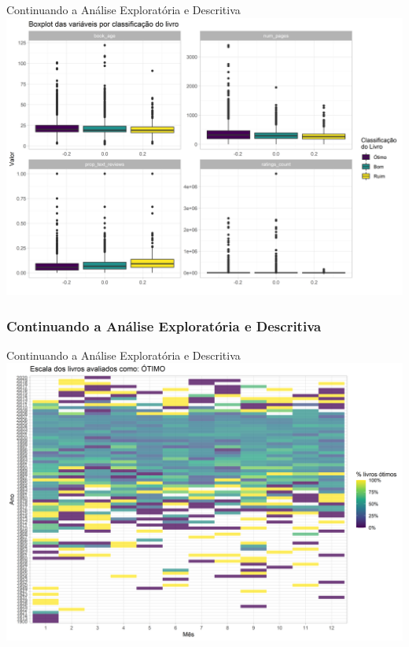 \documentclass[
  9 pt,
  ignorenonframetext,
]{beamer}
\begin{document}
\begin{frame}{Continuando a Análise Exploratória e Descritiva}
\includegraphics{apresentacao_files/figure-beamer/unnamed-chunk-7-1.png}
\end{frame}

\hypertarget{continuando-a-anuxe1lise-exploratuxf3ria-e-descritiva-1}{%
\subsubsection{Continuando a Análise Exploratória e
Descritiva}\label{continuando-a-anuxe1lise-exploratuxf3ria-e-descritiva-1}}

\begin{frame}{Continuando a Análise Exploratória e Descritiva}
\includegraphics{apresentacao_files/figure-beamer/unnamed-chunk-8-1.png}
\end{frame}
\end{document}
